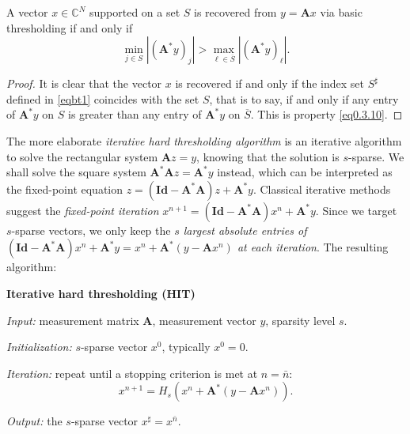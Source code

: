 \begin{proposition}
    \label{pr0.3.7}
    A vector $x \in \mathbb{C}^{N}$ supported on a set $S$ is recovered from $y = \mathbf{A}x$ via basic thresholding if and only if 
    \begin{equation}
        \min\limits_{j \in S}\left|(\mathbf{A}^* y)_j\right| > \max\limits_{\ell \in \overline{S}} \left|(\mathbf{A}^* y )_{\ell}\right|.
        \label{eq0.3.10}
    \end{equation}
\end{proposition}
\begin{proof}
    It is clear that the vector $x$ is recovered if and only if the index set $S^{\sharp}$ defined in \cref{eqbt1} coincides with the set $S$, that is to say, if and only if any entry of $\mathbf{A}^*y$ on $S$ is greater than any entry of $\mathbf{A}^*y$ on $\overline{S}$. This is property \cref{eq0.3.10}.
\end{proof}

The more elaborate \emph{\textcolor[rgb]{1,0,0}{iterative hard thresholding algorithm}} is an iterative algorithm to solve the rectangular system $\mathbf{A}z = y$, knowing that the solution is $s$-sparse. We shall solve the square system $\mathbf{A}^*\mathbf{A}z = \mathbf{A}^*y$ instead, which can be interpreted as the fixed-point equation $z = (\mathbf{Id} - \mathbf{A}^*\mathbf{A})z + \mathbf{A}^*y$. Classical iterative methods suggest the \emph{\textcolor[rgb]{1,0,0}{fixed-point iteration}} $x^{n+1} = (\mathbf{Id} - \mathbf{A}^*\mathbf{A})x^n + \mathbf{A}^*y$. Since we target $s$-sparse vectors, we only keep the \emph{\textcolor[rgb]{1,0,0}{$s$ largest absolute entries of $(\mathbf{Id} - \mathbf{A}^*\mathbf{A})x^n + \mathbf{A}^*y = x^n + \mathbf{A}^*(y - \mathbf{A}x^n)$ at each iteration}}. The resulting algorithm:

\begin{mdframed}
    \label{IHT}
    \begin{center}
        \textbf{\textcolor[rgb]{1,0,0}{Iterative hard thresholding (HIT)}}
    \end{center}
    \emph{Input:} measurement matrix $\mathbf{A}$, measurement vector $y$, sparsity level $s$.

    \emph{Initialization:} $s$-sparse vector $x^0$, typically $x^0 = 0$.

    \emph{Iteration:} repeat until a stopping criterion is met at $n = \bar{n}$:
    \begin{equation}
        x^{n+1} = H_s(x^n + \mathbf{A}^*(y - \mathbf{A}x^n)). \tag{IHT}
        \label{eqiht}
    \end{equation}
    
    \emph{Output:} the $s$-sparse vector $x^{\sharp} = x ^{\bar{n}}$.
\end{mdframed}

